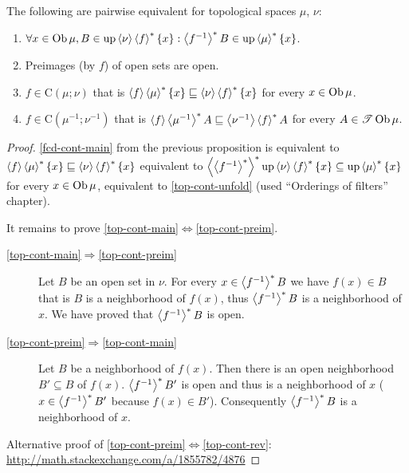 \begin{cor}
  The following are pairwise equivalent for topological spaces $\mu$,
  $\nu$:
  \begin{enumerate}
    \item\label{top-cont-unfold} $\forall x \in \operatorname{Ob} \mu, B \in \operatorname{up} \left\langle \nu\right\rangle
    \left\langle f\right\rangle ^{\ast} \{x\} : \left\langle f^{- 1}\right\rangle ^{\ast} B \in
    \operatorname{up} \left\langle \mu\right\rangle ^{\ast} \{x\}$.

    \item\label{top-cont-preim} Preimages (by $f$) of open sets are open.

    \item\label{top-cont-main} $f \in \mathrm{C} (\mu; \nu)$ that is $\left\langle f\right\rangle
    \left\langle \mu\right\rangle ^{\ast} \{ x \} \sqsubseteq \left\langle \nu\right\rangle
    \left\langle f\right\rangle ^{\ast} \{ x \}$ for every $x \in \operatorname{Ob} \mu$.

    \item\label{top-cont-rev} $f \in \mathrm{C} (\mu^{- 1} ; \nu^{- 1})$ that is $\left\langle f\right\rangle
    \left\langle \mu^{- 1}\right\rangle ^{\ast} A \sqsubseteq \left\langle \nu^{- 1}\right\rangle
    \left\langle f\right\rangle ^{\ast} A$ for every $A \in \mathscr{T}
    \operatorname{Ob} \mu$.
  \end{enumerate}
\end{cor}

\begin{proof}
  \ref{fcd-cont-main} from the previous proposition is equivalent to
  $\left\langle f\right\rangle\left\langle \mu\right\rangle ^{\ast}\{x\}\sqsubseteq\left\langle \nu\right\rangle\left\langle f\right\rangle ^{\ast}\{x\}$
  equivalent to $\left\langle \left\langle f^{- 1}\right\rangle ^{\ast}\right\rangle ^{\ast}
  \operatorname{up} \left\langle \nu\right\rangle \left\langle f\right\rangle ^{\ast} \{ x \} \subseteq
  \operatorname{up} \left\langle \mu\right\rangle ^{\ast} \{ x \}$ for every $x \in \operatorname{Ob}
  \mu$, equivalent to \ref{top-cont-unfold} (used ``Orderings of filters'' chapter).

  It remains to prove \ref{top-cont-main}$\Leftrightarrow$\ref{top-cont-preim}.

  \begin{description}
  \item[\ref{top-cont-main}$\Rightarrow$\ref{top-cont-preim}] Let $B$ be an open set in $\nu$. For every $x \in
  \left\langle f^{- 1}\right\rangle ^{\ast} B$ we have $f (x) \in B$ that is $B$ is a
  neighborhood of $f (x)$, thus $\left\langle f^{-1}\right\rangle ^{\ast}B$ is a neighborhood of $x$. We have
  proved that $\left\langle f^{- 1}\right\rangle ^{\ast} B$ is open.

  \item[\ref{top-cont-preim}$\Rightarrow$\ref{top-cont-main}] Let $B$ be a neighborhood of $f (x)$. Then there is an
  open neighborhood $B' \subseteq B$ of $f (x)$. $\left\langle f^{-1}\right\rangle ^{\ast}
  B'$ is open and thus is a neighborhood of $x$ ($x \in \left\langle f^{-1}\right\rangle ^{\ast} B'$ because $f (x) \in B'$). Consequently
  $\left\langle f^{-1}\right\rangle ^{\ast} B$ is a neighborhood of $x$.
  \end{description}

  Alternative proof of \ref{top-cont-preim}$\Leftrightarrow$\ref{top-cont-rev}:
  \url{http://math.stackexchange.com/a/1855782/4876}
\end{proof}

